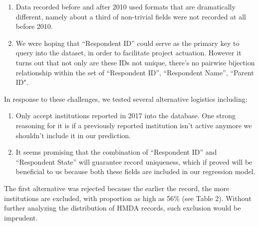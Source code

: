 \documentclass[conference,compsoc]{IEEEtran}
\begin{document}
\begin{enumerate}
\item Data recorded before and after 2010 used formats that are dramatically different, namely about a third of non-trivial fields were not recorded at all before 2010. 
\item We were hoping that “Respondent ID” could serve as the primary key to query into the dataset, in order to facilitate project actuation. However it turns out that not only are these IDs not unique, there’s no pairwise bijection relationship within the set of {“Respondent ID”, “Respondent Name”,  “Parent ID"}. 
\end{enumerate}


In response to these challenges, we tested several alternative logistics including:  
\begin{enumerate}

\item Only accept institutions reported in 2017 into the database. One strong reasoning for it is if a previously reported institution isn’t active anymore we shouldn’t include it in our prediction.
\item  It seems promising that the combination of “Respondent ID” and “Respondent State” will guarantee record uniqueness, which if proved will be beneficial to us because both these fields are included in our regression model.

\end{enumerate}



The first alternative was rejected because the earlier the record, the more institutions are excluded, with proportion as high as 56\% (see Table 2). Without further analyzing the distribution of HMDA records, such exclusion would be imprudent.
\end{document}
